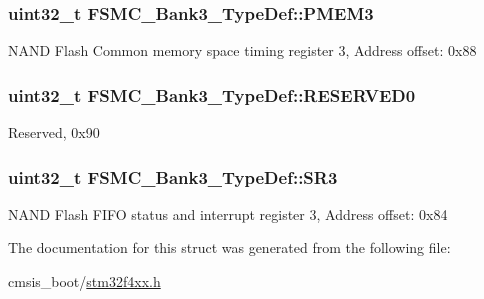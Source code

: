\subsubsection[{\texorpdfstring{P\+M\+E\+M3}{PMEM3}}]{ uint32\+\_\+t F\+S\+M\+C\+\_\+\+Bank3\+\_\+\+Type\+Def\+::\+P\+M\+E\+M3}\hypertarget{struct_f_s_m_c___bank3___type_def_a756258d9266b1eee3455bc850107beb6}{}\label{struct_f_s_m_c___bank3___type_def_a756258d9266b1eee3455bc850107beb6}
N\+A\+ND Flash Common memory space timing register 3, Address offset\+: 0x88 
\subsubsection[{\texorpdfstring{R\+E\+S\+E\+R\+V\+E\+D0}{RESERVED0}}]{\setlength{\rightskip}{0pt plus 5cm}uint32\+\_\+t F\+S\+M\+C\+\_\+\+Bank3\+\_\+\+Type\+Def\+::\+R\+E\+S\+E\+R\+V\+E\+D0}\hypertarget{struct_f_s_m_c___bank3___type_def_a2e9cac528ee7bfce11b0b9a36db3b954}{}\label{struct_f_s_m_c___bank3___type_def_a2e9cac528ee7bfce11b0b9a36db3b954}
Reserved, 0x90 
\subsubsection[{\texorpdfstring{S\+R3}{SR3}}]{ uint32\+\_\+t F\+S\+M\+C\+\_\+\+Bank3\+\_\+\+Type\+Def\+::\+S\+R3}\hypertarget{struct_f_s_m_c___bank3___type_def_ab89f16f64018a1f1e55d36f92b84be94}{}\label{struct_f_s_m_c___bank3___type_def_ab89f16f64018a1f1e55d36f92b84be94}
N\+A\+ND Flash F\+I\+FO status and interrupt register 3, Address offset\+: 0x84 

The documentation for this struct was generated from the following file\+:\begin{DoxyCompactItemize}
\item 
cmsis\+\_\+boot/\hyperlink{stm32f4xx_8h}{stm32f4xx.\+h}\end{DoxyCompactItemize}
